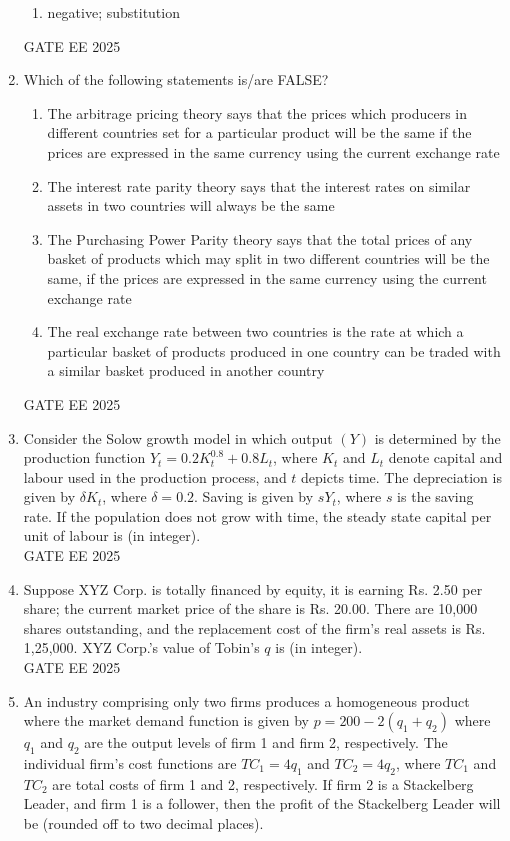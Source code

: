 \documentclass[journal,12pt,onecolumn]{IEEEtran}
\theoremstyle{remark}
\begin{document}
\begin{enumerate}
\begin{enumerate}[label=(\Alph*)]
\item negative; substitution
\end{enumerate}
GATE EE 2025\\
\item Which of the following statements is/are FALSE?
\begin{enumerate}[label=(\Alph*)]
\item The arbitrage pricing theory says that the prices which producers in different countries set for a particular product will be the same if the prices are expressed in the same currency using the current exchange rate
\item The interest rate parity theory says that the interest rates on similar assets in two countries will always be the same
\item The Purchasing Power Parity theory says that the total prices of any basket of products which may split in two different countries will be the same, if the prices are expressed in the same currency using the current exchange rate
\item The real exchange rate between two countries is the rate at which a particular basket of products produced in one country can be traded with a similar basket produced in another country
\end{enumerate}
GATE EE 2025\\
\item Consider the Solow growth model in which output $(Y)$ is determined by the production function $Y_t = 0.2 K_t^{0.8} + 0.8 L_t$, where $K_t$ and $L_t$ denote capital and labour used in the production process, and $t$ depicts time. The depreciation is given by $\delta K_t$, where $\delta = 0.2$. Saving is given by $sY_t$, where $s$ is the saving rate. If the population does not grow with time, the steady state capital per unit of labour is \underline{\hspace{2cm}} (in integer).\\
GATE EE 2025\\
\item Suppose XYZ Corp. is totally financed by equity, it is earning Rs. 2.50 per share; the current market price of the share is Rs. 20.00. There are 10,000 shares outstanding, and the replacement cost of the firm's real assets is Rs. 1,25,000. XYZ Corp.'s value of Tobin's $q$ is \underline{\hspace{2cm}} (in integer).\\
GATE EE 2025\\
\item An industry comprising only two firms produces a homogeneous product where the market demand function is given by $p = 200 - 2(q_1 + q_2)$ where $q_1$ and $q_2$ are the output levels of firm 1 and firm 2, respectively. The individual firm's cost functions are $TC_1 = 4q_1$ and $TC_2 = 4q_2$, where $TC_1$ and $TC_2$ are total costs of firm 1 and 2, respectively. If firm 2 is a Stackelberg Leader, and firm 1 is a follower, then the profit of the Stackelberg Leader will be \underline{\hspace{2cm}} (rounded off to two decimal places).\\

\end{enumerate}
\end{document}
